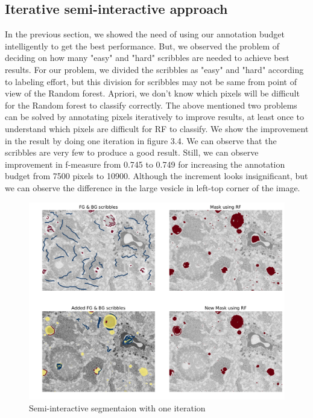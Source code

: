 \subsection{Iterative semi-interactive approach}
In the previous section, we showed the need of using our annotation budget intelligently to get the best performance. But, we observed the problem of deciding on how many "easy" and "hard" scribbles are needed to achieve best results. For our problem, we divided the scribbles as "easy" and "hard" according to labeling effort, but this division for scribbles may not be same from point of view of the Random forest. Apriori, we don't know which pixels will be difficult for the Random forest to classify correctly. The above mentioned two problems can be solved by annotating pixels iteratively to improve results, at least once to understand which pixels are difficult for RF to classify. We show the improvement in the result by doing one iteration in figure 3.4. We can observe that the scribbles are very few to produce a good result. Still, we can observe improvement in f-measure from 0.745 to 0.749 for increasing the annotation budget from 7500 pixels to 10900. Although the increment looks insignificant, but we can observe the difference in the large vesicle in left-top corner of the image.
\begin{figure}[h!] \label{fig:semi-rf}
 \includegraphics[width=1.0\linewidth]{figures/semi_inter_rf.pdf}
\caption{Semi-interactive segmentaion with one iteration}
\end{figure}

